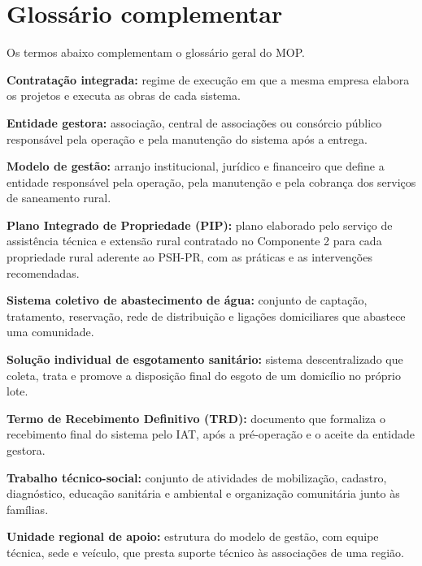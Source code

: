 \chapter*{Glossário complementar}
Os termos abaixo complementam o glossário geral do MOP.

\noindent\textbf{Contratação integrada:} regime de execução em que a mesma empresa elabora os projetos e executa as obras de cada sistema.\par\smallskip
\noindent\textbf{Entidade gestora:} associação, central de associações ou consórcio público responsável pela operação e pela manutenção do sistema após a entrega.\par\smallskip
\noindent\textbf{Modelo de gestão:} arranjo institucional, jurídico e financeiro que define a entidade responsável pela operação, pela manutenção e pela cobrança dos serviços de saneamento rural.\par\smallskip
\noindent\textbf{Plano Integrado de Propriedade (PIP):} plano elaborado pelo serviço de assistência técnica e extensão rural contratado no Componente 2 para cada propriedade rural aderente ao PSH-PR, com as práticas e as intervenções recomendadas.\par\smallskip
\noindent\textbf{Sistema coletivo de abastecimento de água:} conjunto de captação, tratamento, reservação, rede de distribuição e ligações domiciliares que abastece uma comunidade.\par\smallskip
\noindent\textbf{Solução individual de esgotamento sanitário:} sistema descentralizado que coleta, trata e promove a disposição final do esgoto de um domicílio no próprio lote.\par\smallskip
\noindent\textbf{Termo de Recebimento Definitivo (TRD):} documento que formaliza o recebimento final do sistema pelo IAT, após a pré-operação e o aceite da entidade gestora.\par\smallskip
\noindent\textbf{Trabalho técnico-social:} conjunto de atividades de mobilização, cadastro, diagnóstico, educação sanitária e ambiental e organização comunitária junto às famílias.\par\smallskip
\noindent\textbf{Unidade regional de apoio:} estrutura do modelo de gestão, com equipe técnica, sede e veículo, que presta suporte técnico às associações de uma região.\par\smallskip
